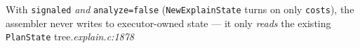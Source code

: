 \begin{frame}
\begin{columns}[T]
\end{columns}

\vspace{2mm}
{\footnotesize With \texttt{signaled} \emph{and} \texttt{analyze=false}
(\texttt{NewExplainState} turns on only \texttt{costs}), the assembler
never writes to executor-owned state --- it only \emph{reads} the existing
\texttt{PlanState} tree.\hfill{\itshape explain.c:1878}}
\end{frame}

%
